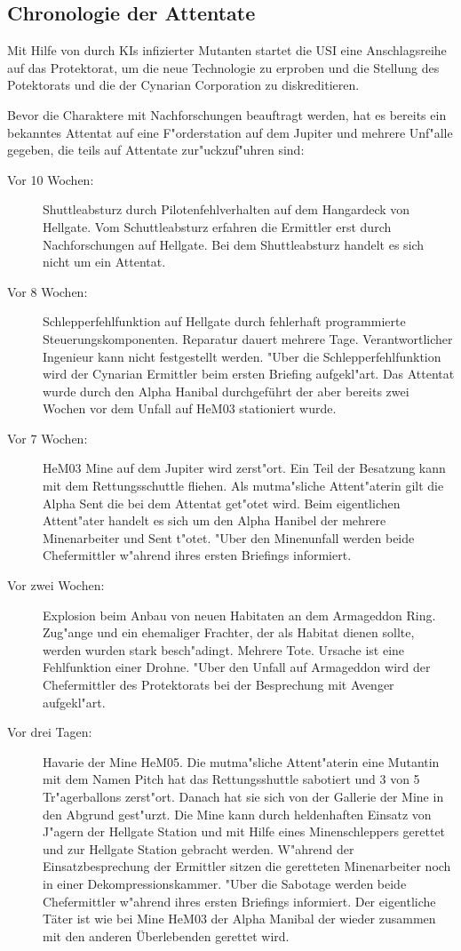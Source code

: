 \subsection{Chronologie der Attentate}

Mit Hilfe von durch KIs infizierter Mutanten startet die USI eine Anschlagsreihe auf das Protektorat, um die neue Technologie zu erproben und die Stellung des Potektorats und die der Cynarian Corporation zu diskreditieren.

Bevor die Charaktere mit Nachforschungen beauftragt werden, hat es bereits ein bekanntes Attentat auf eine F"orderstation auf dem Jupiter und mehrere Unf"alle gegeben, die teils auf Attentate zur"uckzuf"uhren sind:

\begin{description}
\item [Vor 10 Wochen:] Shuttleabsturz durch Pilotenfehlverhalten auf dem Hangardeck von Hellgate. Vom Schuttleabsturz erfahren die Ermittler erst durch Nachforschungen auf Hellgate. Bei dem Shuttleabsturz handelt es sich nicht um ein Attentat.
\item [Vor 8 Wochen:] Schlepperfehlfunktion auf Hellgate durch fehlerhaft programmierte Steuerungskomponenten. Reparatur dauert
      mehrere Tage. Verantwortlicher Ingenieur kann nicht festgestellt werden. "Uber die Schlepperfehlfunktion wird der Cynarian Ermittler beim ersten Briefing aufgekl"art. Das Attentat wurde durch den Alpha Hanibal durchgeführt der aber bereits zwei Wochen vor dem Unfall auf HeM03 stationiert wurde.      
\item [Vor 7 Wochen:] HeM03 Mine auf dem Jupiter wird zerst"ort. Ein Teil der Besatzung kann mit dem
      Rettungsschuttle fliehen. Als mutma"sliche Attent"aterin gilt die Alpha Sent die bei dem Attentat get"otet wird. Beim eigentlichen Attent"ater handelt es sich um den Alpha Hanibel der mehrere Minenarbeiter und Sent t"otet. "Uber den Minenunfall werden beide Chefermittler w"ahrend ihres ersten Briefings informiert.
\item [Vor zwei Wochen:] Explosion beim Anbau von neuen Habitaten an dem Armageddon Ring. Zug"ange und ein
      ehemaliger Frachter, der als Habitat dienen sollte, werden wurden stark besch"adingt.  Mehrere Tote. Ursache ist eine Fehlfunktion einer Drohne. "Uber den Unfall auf Armageddon wird der Chefermittler des Protektorats bei der Besprechung mit Avenger aufgekl"art.
\item [Vor drei Tagen:] Havarie der Mine HeM05. Die mutma"sliche Attent"aterin eine Mutantin mit dem Namen Pitch hat das
      Rettungsshuttle sabotiert und 3 von 5 Tr"agerballons zerst"ort. Danach hat sie sich von der Gallerie der Mine in den Abgrund gest"urzt. Die Mine kann durch heldenhaften Einsatz von J"agern der Hellgate Station und mit Hilfe eines Minenschleppers gerettet und zur Hellgate Station gebracht werden. W"ahrend der Einsatzbesprechung der Ermittler sitzen die geretteten Minenarbeiter noch in einer Dekompressionskammer. "Uber die Sabotage werden beide Chefermittler w"ahrend ihres ersten Briefings informiert. Der eigentliche
      Täter ist wie bei Mine HeM03 der Alpha Manibal der wieder zusammen mit den anderen Überlebenden gerettet wird.
\end{description}

